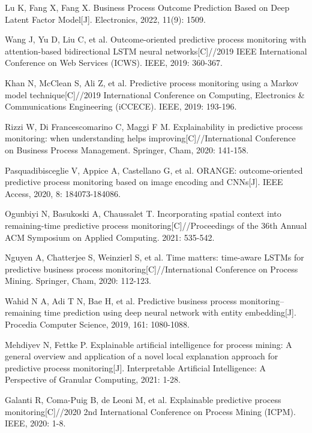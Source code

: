 \documentclass[runningheads]{llncs}
\begin{document}
\begin{thebibliography}{99}
	Lu K, Fang X, Fang X. Business Process Outcome Prediction Based on Deep Latent Factor Model[J]. Electronics, 2022, 11(9): 1509.
	
	Wang J, Yu D, Liu C, et al. Outcome-oriented predictive process monitoring with attention-based bidirectional LSTM neural networks[C]//2019 IEEE International Conference on Web Services (ICWS). IEEE, 2019: 360-367.
	
	Khan N, McClean S, Ali Z, et al. Predictive process monitoring using a Markov model technique[C]//2019 International Conference on Computing, Electronics \& Communications Engineering (iCCECE). IEEE, 2019: 193-196.
	
	Rizzi W, Di Francescomarino C, Maggi F M. Explainability in predictive process monitoring: when understanding helps improving[C]//International Conference on Business Process Management. Springer, Cham, 2020: 141-158.
	
	Pasquadibisceglie V, Appice A, Castellano G, et al. ORANGE: outcome-oriented predictive process monitoring based on image encoding and CNNs[J]. IEEE Access, 2020, 8: 184073-184086.
	
	Ogunbiyi N, Basukoski A, Chaussalet T. Incorporating spatial context into remaining-time predictive process monitoring[C]//Proceedings of the 36th Annual ACM Symposium on Applied Computing. 2021: 535-542.
	
	Nguyen A, Chatterjee S, Weinzierl S, et al. Time matters: time-aware LSTMs for predictive business process monitoring[C]//International Conference on Process Mining. Springer, Cham, 2020: 112-123.
	
	Wahid N A, Adi T N, Bae H, et al. Predictive business process monitoring–remaining time prediction using deep neural network with entity embedding[J]. Procedia Computer Science, 2019, 161: 1080-1088.
	
	Mehdiyev N, Fettke P. Explainable artificial intelligence for process mining: A general overview and application of a novel local explanation approach for predictive process monitoring[J]. Interpretable Artificial Intelligence: A Perspective of Granular Computing, 2021: 1-28.
	
	Galanti R, Coma-Puig B, de Leoni M, et al. Explainable predictive process monitoring[C]//2020 2nd International Conference on Process Mining (ICPM). IEEE, 2020: 1-8.
	

\end{thebibliography}
\end{document}

